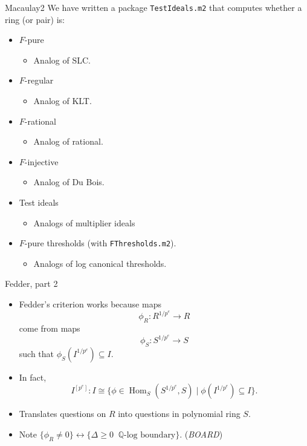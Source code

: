 \documentclass[xcolor=dvipsnames]{beamer}
\newcommand{\memph}[1]{{\color{Red}\emph{#1}}}
\DeclareMathOperator{\Hom}{Hom}
\theoremstyle{remark}
\begin{document}
\begin{frame}[c]{Macaulay2}
  We have written a package {\tt TestIdeals.m2} that computes whether a ring (or pair) is:
  \begin{itemize}
    \item<2->  $F$-pure
    \begin{itemize}
      \item<3->  Analog of SLC.
    \end{itemize}
    \item<4->  $F$-regular
    \begin{itemize}
      \item<5->  Analog of KLT.
    \end{itemize}
    \item<6->  $F$-rational
    \begin{itemize}
      \item<7->  Analog of rational.
    \end{itemize}
    \item<7->  $F$-injective
    \begin{itemize}
      \item<8->  Analog of Du Bois.
    \end{itemize}
    \item<8->  Test ideals
    \begin{itemize}
      \item<9->  Analogs of multiplier ideals
    \end{itemize}
    \item<10->  $F$-pure thresholds (with {\tt FThresholds.m2}).
    \begin{itemize}
      \item<11->  Analogs of log canonical thresholds.
    \end{itemize}

  \end{itemize}
\end{frame}


\begin{frame}[c]{Fedder, part 2}
  \begin{itemize}
  \item<1->Fedder's criterion works because maps
  \[
  \phi_R : R^{1/p^e} \to R
  \]
  come from maps
  \[
  \phi_S : S^{1/p^e} \to S
  \]
  such that $\phi_S(I^{1/p^e}) \subseteq I$.
\item<2->  In fact,
\[
I^{[p^e]} : I \cong \{ \phi \in \Hom_S(S^{1/p^e}, S) \;|\; \phi(I^{1/p^e}) \subseteq I \}.
\]
\item<3->  Translates questions on $R$ into questions in polynomial ring $S$.
\item<4->  Note $\{\phi_R \neq 0\} \leftrightarrow \{\Delta\geq 0\;\; \text{$\mathbb{Q}$-log boundary} \}$.  (\memph{BOARD})
\end{itemize}
\end{frame}
\end{document}
